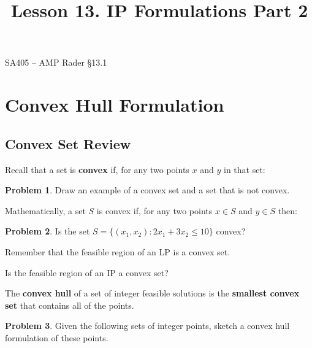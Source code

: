 \documentclass[11pt]{article}
\makeatletter
\theoremstyle{definition}
\newtheorem{problem}{Problem}
\renewcommand{\maketitle}{
  \noindent SA405 -- AMP \hfill Rader \S 13.1  \\

  \begin{center}\Large{\textbf{\@title}}\end{center}
}
\makeatother
\begin{document}
  
\title{Lesson 13.  IP Formulations Part 2}

\maketitle


\section{Convex Hull Formulation}

\subsection{Convex Set Review}

Recall that a set is \textbf{convex} if, for any two points $x$ and $y$ in that set: \vspace{0.5in}

\begin{problem}
Draw an example of a convex set and a set that is not convex.
\end{problem}

\vspace{1.5in}


Mathematically, a set $S$ is convex if, for any two points $x \in S$ and $y \in S$ then: \vspace{0.5in}

\begin{problem}
Is the set $S = \{(x_1, x_2): 2 x_1 + 3 x_2 \leq 10\}$ convex?
\end{problem}

\vspace{1.5in}

\begin{tcolorbox}
Remember that the feasible region of an LP is a convex set.
\end{tcolorbox}

Is the feasible region of an IP a convex set?

\newpage

\begin{tcolorbox}
The \textbf{convex hull} of a set of integer feasible solutions is the \textbf{smallest convex set} that contains all of the points. 
\end{tcolorbox}


\begin{problem}
Given the following sets of integer points, sketch a convex hull formulation of these points.
\end{problem}
\end{document}
